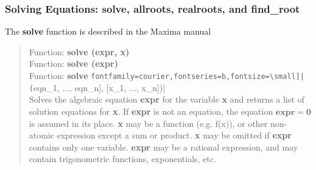 \documentclass[11pt]{article}
\newcommand{\mvs}{\Verb[fontfamily=courier,fontseries=b,fontsize=\small]}
\begin{document}
\subsubsection{Solving Equations: \textbf{solve, allroots, realroots,} and \textbf{find\_root}}
The \textbf{solve} function is described in the Maxima manual
\begin{quote}
Function: \textbf{solve (expr, x)}\\ 
Function: \textbf{solve (expr)}\\ 
Function: \textbf{solve} \mvs|([eqn_1, ..., eqn_n], [x_1, ..., x_n])|\\ 
Solves the algebraic equation \textbf{expr} for the variable \textbf{x} 
   and returns a list of solution equations for \textbf{x}. If \textbf{expr}
   is not an equation, the equation $\mathbf{expr = 0}$ is assumed in its place.
   \textbf{x} may be a function (e.g. f(x)), or other non-atomic 
   expression except a sum or product.
   \textbf{x} may be omitted if \textbf{expr} contains only one variable.
   \textbf{expr} may be a rational expression, and may contain trigonometric
   functions, exponentials, etc. 
\end{quote}
\end{document}
